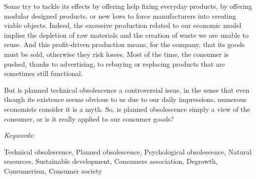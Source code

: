 Some try to tackle its effects by offering help fixing everyday products, by offering modular designed products, or new laws to force manufacturers into creating viable objects. Indeed, the excessive production related to our economic model implies the depletion of raw materials and the creation of waste we are unable to reuse. And this profit-driven production means, for the company, that its goods must be sold, otherwise they risk losses. Most of the time, the consumer is pushed, thanks to advertising, to rebuying or replacing products that are sometimes still functional.

But is planned technical obsolescence a controversial issue, in the sense that even though its existence seems obvious to us due to our daily impressions, numerous economists consider it is a myth. So, is planned obsolescence simply a view of the consumer, or is it really applied to our consumer goods?

\vspace{2\baselineskip}

\begin{large}\emph{Keywords:} \end{large} Technical obsolescence, Planned obsolescence, Psychological obsolescence, Natural resources, Sustainable development, Consumers association, Degrowth, Consumerism, Consumer society
